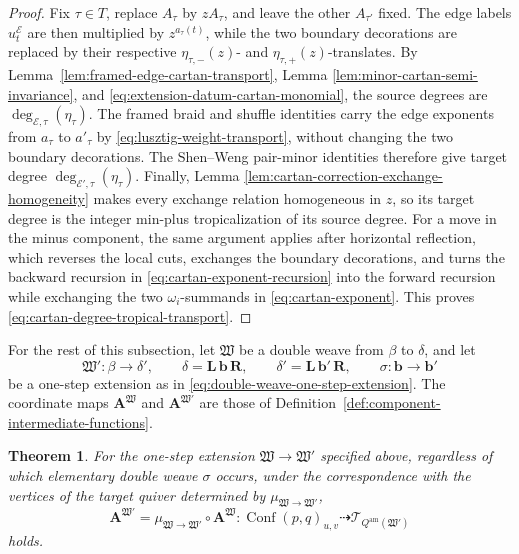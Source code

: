 \documentclass[10pt,a4paper]{article}
\newtheorem{theorem}{Theorem}[section]
\theoremstyle{definition}
\theoremstyle{remark}
\newcommand{\Conf}{\operatorname{Conf}}
\newcommand{\Tcal}{\mathcal T}
\newcommand{\fW}{\mathfrak W}
\begin{document}
\begin{proof}
Fix \(\tau\in T\), replace \(A_\tau\) by \(zA_\tau\), and leave the other
\(A_{\tau'}\) fixed.  The edge labels \(u_t^{\mathcal E}\) are then multiplied
by \(z^{a_\tau(t)}\), while the two boundary decorations are replaced by their
respective \(\eta_{\tau,-}(z)\)- and \(\eta_{\tau,+}(z)\)-translates.  By
Lemma~\ref{lem:framed-edge-cartan-transport}, Lemma
\ref{lem:minor-cartan-semi-invariance}, and
\eqref{eq:extension-datum-cartan-monomial}, the source degrees are
\(\deg_{\mathcal E,\tau}(\eta_\tau)\).  The framed braid and shuffle
identities carry the edge exponents from \(a_\tau\) to \(a'_\tau\) by
\eqref{eq:lusztig-weight-transport}, without changing the two boundary
decorations.  The Shen--Weng pair-minor identities
\cite[Section~3]{ShenWeng2021} therefore give target
degree \(\deg_{\mathcal E',\tau}(\eta_\tau)\).  Finally, Lemma
\ref{lem:cartan-correction-exchange-homogeneity} makes every exchange relation
homogeneous in \(z\), so its target degree is the integer min-plus
tropicalization of its source degree.  For a move in the minus component, the
same argument applies after horizontal reflection, which reverses the local
cuts, exchanges the boundary decorations, and turns the backward recursion in
\eqref{eq:cartan-exponent-recursion} into the forward recursion while
exchanging the two \(\omega_i\)-summands in
\eqref{eq:cartan-exponent}.  This proves
\eqref{eq:cartan-degree-tropical-transport}.
\end{proof}

For the rest of this subsection, let \(\fW\) be a double weave from \(\beta\)
to \(\delta\), and let
\[
 \fW':\beta\longrightarrow\delta',
 \qquad
 \delta=\mathbf L\,\mathbf b\,\mathbf R,
 \qquad
 \delta'=\mathbf L\,\mathbf b'\,\mathbf R,
 \qquad
 \sigma:\mathbf b\longrightarrow\mathbf b'
\]
be a one-step extension as in
\eqref{eq:double-weave-one-step-extension}.  The coordinate maps
\(\mathbf A^\fW\) and \(\mathbf A^{\fW'}\) are those of
Definition~\ref{def:component-intermediate-functions}.

\begin{theorem}
\label{thm:one-step-coordinate-term}
For the one-step extension \(\fW\to\fW'\) specified above, regardless of which
elementary double weave \(\sigma\) occurs, under the correspondence with the
vertices of the target quiver determined by \(\mu_{\fW\to\fW'}\),
\begin{equation}
 \mathbf A^{\fW'}
 =\mu_{\fW\to\fW'}\circ\mathbf A^\fW:
 \Conf(p,q)_{u,v}
 \dashrightarrow\Tcal_{Q^{\mathrm{am}}(\fW')}
 \label{eq:one-step-coordinate-compatibility}
\end{equation}
holds.
\end{theorem}
\end{document}

